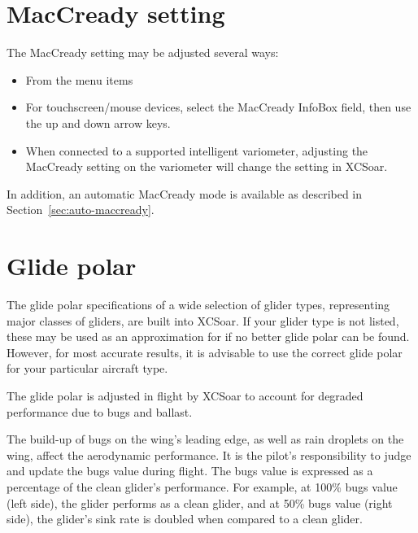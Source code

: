 \documentclass[a4paper,12pt]{refrep}
\begin{document}
\section{MacCready setting}

The MacCready setting may be adjusted several ways:
\begin{itemize}
\item From the menu items
\begin{quote}
\blink{} 

\blink{}
\end{quote}
\item For touchscreen/mouse devices, select the MacCready InfoBox field, then
  use the up and down arrow keys.
\item When connected to a supported intelligent variometer, adjusting
  the MacCready setting on the variometer will change the setting
  in XCSoar.
\end{itemize}
In addition, an automatic MacCready mode is available as described in
Section~\ref{sec:auto-maccready}.

\section{Glide polar}

The glide polar specifications of a wide selection of glider types,
representing major classes of gliders, are built into XCSoar.
If your glider type is not listed, these may be used as an approximation for  
if no better glide polar can be found.  However, for most accurate results, it is
advisable to use the correct glide polar for your particular
 aircraft type. 

The glide polar is adjusted in flight by XCSoar to account for
degraded performance due to bugs and ballast.

The build-up of bugs on the wing's leading edge, as well as rain
droplets on the wing, affect the aerodynamic performance.  It is the
pilot's responsibility to judge and update the bugs value during
flight.  The bugs value is expressed as a percentage of the clean
glider's performance.  For example, at 100\% bugs value (left side), the glider
performs as a clean glider, and at 50\% bugs value (right side), the glider's
sink rate is doubled when compared to a clean glider. 
\end{document}
